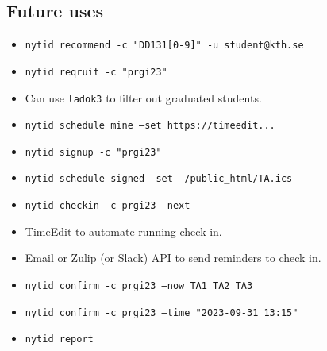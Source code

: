 \subsection{Future uses}

\begin{frame}[fragile]
  \begin{example}[TA pool]
    \begin{itemize}
      \item \texttt{nytid recommend -c "DD131[0-9]" -u student@kth.se}
      \item \texttt{nytid reqruit -c "prgi23"}
      \item Can use \texttt{ladok3} to filter out graduated students.
    \end{itemize}
  \end{example}
  
  \pause

  \begin{example}[TA sign up]
    \begin{itemize}
      \item \texttt{nytid schedule mine --set  https://timeedit...}
      \item \texttt{nytid signup -c "prgi23"}
      \item \texttt{nytid schedule signed --set ~/public_html/TA.ics}
    \end{itemize}
  \end{example}
\end{frame}

\begin{frame}[fragile]
  \begin{example}[TA confirmation]
    \begin{itemize}
      \item \texttt{nytid checkin -c prgi23 --next }
      \item TimeEdit to automate running check-in.
      \item Email or Zulip (or Slack) API to send reminders to check in.
      \item \texttt{nytid confirm -c prgi23 --now TA1 TA2 TA3}
      \item \texttt{nytid confirm -c prgi23 --time "2023-09-31 13:15"}
    \end{itemize}
  \end{example}

  \pause

  \begin{example}
    \begin{itemize}
      \item \texttt{nytid report}
    \end{itemize}
  \end{example}
\end{frame}


